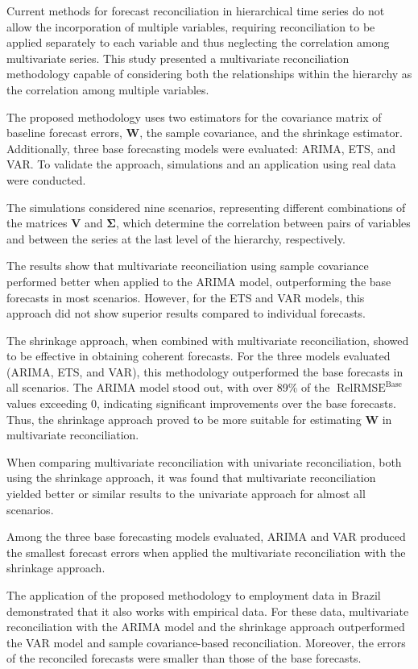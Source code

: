 \documentclass[a4paper,preprint,11pt,authoryear]{elsarticle}
\DeclareMathOperator{\RelRMSE}{RelRMSE}
\DeclareMathOperator{\Base}{Base}
\begin{document}
Current methods for forecast reconciliation in hierarchical time series do not allow the incorporation of multiple variables, requiring reconciliation to be applied separately to each variable and thus neglecting the correlation among multivariate series. This study presented a multivariate reconciliation methodology capable of considering both the relationships within the hierarchy as the correlation among multiple variables.

The proposed methodology uses two estimators for the covariance matrix of baseline forecast errors, $\bm{W}$, the sample covariance, and the shrinkage estimator. Additionally, three base forecasting models were evaluated: ARIMA, ETS, and VAR. To validate the approach, simulations and an application using real data were conducted.

The simulations considered nine scenarios, representing different combinations of the matrices $\bm{V}$ and $\bm{\Sigma}$, which determine the correlation between pairs of variables and between the series at the last level of the hierarchy, respectively.

The results show that multivariate reconciliation using sample covariance performed better when applied to the ARIMA model, outperforming the base forecasts in most scenarios. However, for the ETS and VAR models, this approach did not show superior results compared to individual forecasts.

The shrinkage approach, when combined with multivariate reconciliation, showed to be effective in obtaining coherent forecasts. For the three models evaluated (ARIMA, ETS, and VAR), this methodology outperformed the base forecasts in all scenarios. The ARIMA model stood out, with over 89\% of the $\RelRMSE^{\Base}$ values exceeding 0, indicating significant improvements over the base forecasts. Thus, the shrinkage approach proved to be more suitable for estimating $\bm{W}$ in multivariate reconciliation.

When comparing multivariate reconciliation with univariate reconciliation, both using the shrinkage approach, it was found that multivariate reconciliation yielded better or similar results to the univariate approach for almost all scenarios.

Among the three base forecasting models evaluated, ARIMA and VAR produced the smallest forecast errors when applied the multivariate reconciliation with the shrinkage approach.

The application of the proposed methodology to employment data in Brazil demonstrated that it also works with empirical data. For these data, multivariate reconciliation with the ARIMA model and the shrinkage approach outperformed the VAR model and sample covariance-based reconciliation. Moreover, the errors of the reconciled forecasts were smaller than those of the base forecasts.
\end{document}
